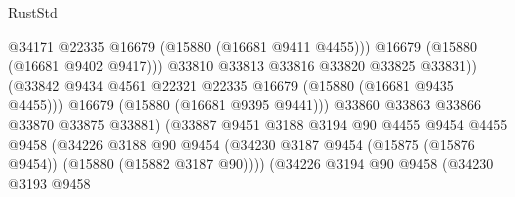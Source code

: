 \begin{lexlean}{RustStd}
\begin{coremodule}
                                                @34171
                                                @22335
                                                @16679
                                                (@15880 (@16681 @9411 @4455)))
                                              @16679
                                              (@15880 (@16681 @9402 @9417)))
                                            @33810
                                            @33813
                                            @33816
                                            @33820
                                            @33825
                                            @33831))
                                        (@33842
                                          @9434
                                          @4561
                                          @22321
                                          @22335
                                          @16679
                                          (@15880 (@16681 @9435 @4455)))
                                        @16679
                                        (@15880 (@16681 @9395 @9441)))
                                      @33860
                                      @33863
                                      @33866
                                      @33870
                                      @33875
                                      @33881)
                                    (@33887
                                      @9451
                                      @3188
                                      @3194
                                      @90
                                      @4455
                                      @9454
                                      @4455
                                      @9458
                                      (@34226
                                        @3188
                                        @90
                                        @9454
                                        (@34230
                                          @3187
                                          @9454
                                          (@15875 (@15876 @9454))
                                          (@15880 (@15882 @3187 @90))))
                                      (@34226
                                        @3194
                                        @90
                                        @9458
                                        (@34230
                                          @3193
                                          @9458

\end{coremodule}
\end{lexlean}

